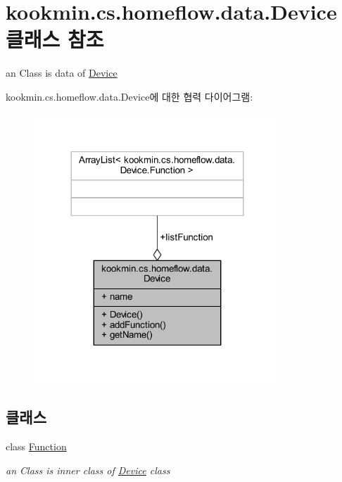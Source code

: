 \hypertarget{classkookmin_1_1cs_1_1homeflow_1_1data_1_1_device}{}\section{kookmin.\+cs.\+homeflow.\+data.\+Device 클래스 참조}
\label{classkookmin_1_1cs_1_1homeflow_1_1data_1_1_device}


an Class is data of \hyperlink{classkookmin_1_1cs_1_1homeflow_1_1data_1_1_device}{Device}  




kookmin.\+cs.\+homeflow.\+data.\+Device에 대한 협력 다이어그램\+:
\nopagebreak
\begin{figure}[H]
\begin{center}
\leavevmode
\includegraphics[width=263pt]{classkookmin_1_1cs_1_1homeflow_1_1data_1_1_device__coll__graph}
\end{center}
\end{figure}
\subsection*{클래스}
\begin{DoxyCompactItemize}
\item 
class \hyperlink{classkookmin_1_1cs_1_1homeflow_1_1data_1_1_device_1_1_function}{Function}
\begin{DoxyCompactList}\small\item\em an Class is inner class of \hyperlink{classkookmin_1_1cs_1_1homeflow_1_1data_1_1_device}{Device} class \end{DoxyCompactList}\end{DoxyCompactItemize}
